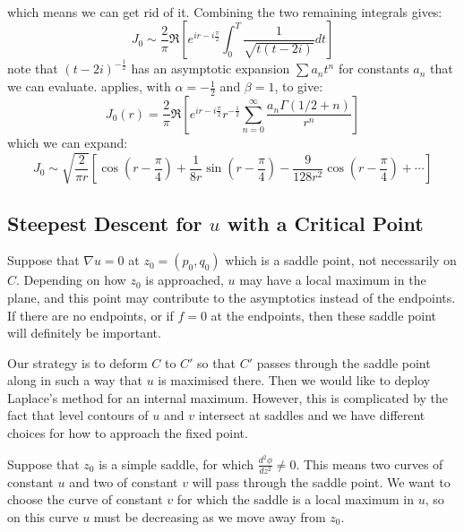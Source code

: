 \documentclass[../Main.tex]{subfiles}
\begin{document}
\begin{example}
\begin{align*}
    \end{align*}
    which means we can get rid of it. Combining the two remaining integrals gives:
    \begin{equation*}
        J_0 \sim \frac{2}{\pi} \Re\left[e^{ir - i \frac\pi2} \int_{0}^{T} \frac{1}{\sqrt{t(t- 2i)}} dt \right]
    \end{equation*}
    note that $(t - 2i)^{-\frac12}$ has an asymptotic expansion $\sum a_n t^n$ for constants $a_n$ that we can evaluate.  applies, with $\alpha = -\frac12$ and $\beta = 1$, to give:
    \begin{equation*}
        J_0(r) = \frac{2}{\pi} \Re\left[e^{ir - i\frac\pi 2} r^{-\frac12} \sum_{n=0}^{\infty} \frac{a_n \Gamma(1 / 2 + n)}{r^n}\right]
    \end{equation*}
    which we can expand:
    \begin{equation*}
        J_0 \sim \sqrt{\frac{2}{\pi r}} \left[\cos\left(r - \frac\pi4\right) + \frac{1}{8r}\sin\left(r - \frac\pi 4\right) - \frac{9}{128r^2} \cos\left(r - \frac\pi 4\right) + \cdots\right]
    \end{equation*}
\end{example}
\subsection{Steepest Descent for \texorpdfstring{$u$}{u} with a Critical Point}
Suppose that $\nabla u = 0$ at $z_0 = (p_0, q_0)$ which is a saddle point, not necessarily on $C$. Depending on how $z_0$ is approached, $u$ may have a local maximum in the plane, and this point may contribute to the asymptotics instead of the endpoints. If there are no endpoints, or if $f = 0$ at the endpoints, then these saddle point will definitely be important.

Our strategy is to deform $C$ to $C'$ so that $C'$ passes through the saddle point along in such a way that $u$ is maximised there. Then we would like to deploy Laplace's method for an internal maximum. However, this is complicated by the fact that level contours of $u$ and $v$ intersect at saddles and we have different choices for how to approach the fixed point.

Suppose that $z_0$ is a simple saddle, for which $\frac{d^{2}\phi}{dz^{2}} \neq 0$. This means two curves of constant $u$ and two of constant $v$ will pass through the saddle point. We want to choose the curve of constant $v$ for which the saddle is a local maximum in $u$, so on this curve $u$ must be decreasing as we move away from $z_0$.
\end{document}
